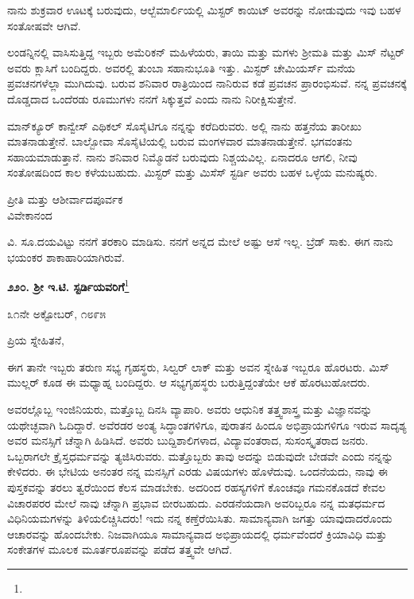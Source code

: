 ನಾನು ಶುಕ್ರವಾರ ಊಟಕ್ಕೆ ಬರುವುದು, ಆಲ್ಬೆಮಾರ್ಲಿಯಲ್ಲಿ ಮಿಸ್ಟರ್ ಕಾಯಿಟ್ ಅವರನ್ನು ನೋಡುವುದು ಇವು ಬಹಳ ಸಂತೋಷವೇ ಆಗಿವೆ.

\vspace{0.1cm}

ಲಂಡನ್ನಿನಲ್ಲಿ ವಾಸಿಸುತ್ತಿದ್ದ ಇಬ್ಬರು ಅಮೆರಿಕನ್‌ ಮಹಿಳೆಯರು, ತಾಯಿ ಮತ್ತು ಮಗಳು ಶ‍್ರೀಮತಿ ಮತ್ತು ಮಿಸ್‌ ನೆಟ್ಟರ್ ಅವರು ಕ್ಲಾಸಿಗೆ ಬಂದಿದ್ದರು. ಅವರಲ್ಲಿ ತುಂಬಾ ಸಹಾನುಭೂತಿ ಇತ್ತು. ಮಿಸ್ಟರ್ ಚೇಮಿಯರ್ಸ್ ಮನೆಯ ಪ್ರವಚನಗಳೆಲ್ಲಾ ಮುಗಿದುವು. ಬರುವ ಶನಿವಾರ ರಾತ್ರಿಯಿಂದ ನಾನಿರುವ ಕಡೆ ಪ್ರವಚನ ಪ್ರಾರಂಭಿಸುವೆ. ನನ್ನ ಪ್ರವಚನಕ್ಕೆ ದೊಡ್ಡದಾದ ಒಂದೆರಡು ರೂಮುಗಳು ನನಗೆ ಸಿಕ್ಕುತ್ತವೆ ಎಂದು ನಾನು ನಿರೀಕ್ಷಿಸುತ್ತೇನೆ.

\vspace{0.1cm}

ಮಾನ್‌ಕ್ಯೂರ್ ಕಾನ್ವೇಸ್ ಎಥಿಕಲ್ ಸೊಸೈಟಿಗೂ ನನ್ನನ್ನು ಕರೆದಿರುವರು. ಅಲ್ಲಿ ನಾನು ಹತ್ತನೆಯ ತಾರೀಖು ಮಾತನಾಡುತ್ತೇನೆ. ಬಾಲ್ಬೋವಾ ಸೊಸೈಟಿಯಲ್ಲಿ ಬರುವ ಮಂಗಳವಾರ ಮಾತನಾಡುತ್ತೇನೆ. ಭಗವಂತನು ಸಹಾಯಮಾಡುತ್ತಾನೆ. ನಾನು ಶನಿವಾರ ನಿಮ್ಮೊಡನೆ ಬರುವುದು ನಿಶ್ಚಯವಿಲ್ಲ. ಏನಾದರೂ ಆಗಲಿ, ನೀವು ಸಂತೋಷದಿಂದ ಕಾಲ ಕಳೆಯಬಹುದು. ಮಿಸ್ಟರ್‌ ಮತ್ತು ಮಿಸೆಸ್ ಸ್ಟರ್ಡಿ ಅವರು ಬಹಳ ಒಳ್ಳೆಯ ಮನುಷ್ಯರು.

\begin{flushright}
ಪ್ರೀತಿ ಮತ್ತು ಆಶೀರ್ವಾದಪೂರ್ವಕ\\ವಿವೇಕಾನಂದ
\end{flushright}

ವಿ. ಸೂ.\enginline{-}ದಯವಿಟ್ಟು ನನಗೆ ತರಕಾರಿ ಮಾಡಿಸು. ನನಗೆ ಅನ್ನದ ಮೇಲೆ ಅಷ್ಟು ಆಸೆ ಇಲ್ಲ. ಬ್ರೆಡ್ ಸಾಕು. ಈಗ ನಾನು ಭಯಂಕರ ಶಾಕಾಹಾರಿಯಾಗಿರುವೆ.

\begin{center}
\textbf{೨೨೦. ಶ‍್ರೀ ಇ.ಟಿ. ಸ್ಟರ್ಡಿಯವರಿಗೆ}\footnote{}
\end{center}

\begin{flushright}
೩೧ನೇ ಅಕ್ಟೋಬರ್, ೧೮೯೫
\end{flushright}

\noindent
ಪ್ರಿಯ ಸ್ನೇಹಿತನೆ,

\vspace{0.1cm}

ಈಗ ತಾನೇ ಇಬ್ಬರು ತರುಣ ಸಭ್ಯ ಗೃಹಸ್ಥರು, ಸಿಲ್ವರ್ ಲಾಕ್ ಮತ್ತು ಅವನ ಸ್ನೇಹಿತ ಇಬ್ಬರೂ ಹೊರಟರು. ಮಿಸ್ ಮುಲ್ಲರ್ ಕೂಡ ಈ ಮಧ್ಯಾಹ್ನ ಬಂದಿದ್ದರು. ಆ ಸಭ್ಯಗೃಹಸ್ಥರು ಬರುತ್ತಿದ್ದಂತೆಯೇ ಆಕೆ ಹೊರಟುಹೋದರು.

\vspace{0.1cm}

ಅವರಲ್ಲೊಬ್ಬ ಇಂಜಿನಿಯರು, ಮತ್ತೊಬ್ಬ ದಿನಸಿ ವ್ಯಾಪಾರಿ. ಅವರು ಆಧುನಿಕ ತತ್ತ್ವಶಾಸ್ತ್ರ ಮತ್ತು ವಿಜ್ಞಾನವನ್ನು ಯಥೇಚ್ಛವಾಗಿ ಓದಿದ್ದಾರೆ. ಅವೆರಡರ ಅಂತ್ಯ ಸಿದ್ಧಾಂತಗಳಿಗೂ, ಪುರಾತನ ಹಿಂದೂ ಅಭಿಪ್ರಾಯಗಳಿಗೂ ಇರುವ ಸಾದೃಶ್ಯ ಅವರ ಮನಸ್ಸಿಗೆ ಚೆನ್ನಾಗಿ ಹಿಡಿಸಿದೆ. ಅವರು ಬುದ್ದಿಶಾಲಿಗಳಾದ, ವಿದ್ಯಾವಂತರಾದ, ಸುಸಂಸ್ಕೃತರಾದ ಜನರು. ಒಬ್ಬರಾಗಲೇ ಕ್ರೈಸ್ತಧರ್ಮವನ್ನು ತ್ಯಜಿಸಿರುವರು. ಮತ್ತೊಬ್ಬರು ತಾವು ಅದನ್ನು ಬಿಡುವುದೇ ಬೇಡವೇ ಎಂದು ನನ್ನನ್ನು ಕೇಳಿದರು. ಈ ಭೇಟಿಯ ಅನಂತರ ನನ್ನ ಮನಸ್ಸಿಗೆ ಎರಡು ವಿಷಯಗಳು ಹೊಳೆದುವು. ಒಂದನೆಯದು, ನಾವು ಈ ಪುಸ್ತಕವನ್ನು ತರಲು ತ್ವರೆಯಿಂದ ಕೆಲಸ ಮಾಡಬೇಕು. ಅದರಿಂದ ರಹಸ್ಯಗಳಿಗೆ ಕೊಂಚವೂ ಗಮನಕೊಡದೆ ಕೇವಲ ವಿಚಾರಪರರ ಮೇಲೆ ನಾವು ಚೆನ್ನಾಗಿ ಪ್ರಭಾವ ಬೀರಬಹುದು. ಎರಡನೆಯದಾಗಿ ಅವರಿಬ್ಬರೂ ನನ್ನ ಮತಧರ್ಮದ ವಿಧಿನಿಯಮಗಳನ್ನು ತಿಳಿಯಲಿಚ್ಚಿಸಿದರು! ಇದು ನನ್ನ ಕಣ್ತೆರೆಯಿಸಿತು. ಸಾಮಾನ್ಯವಾಗಿ ಜಗತ್ತು ಯಾವುದಾದರೊಂದು ಆಚಾರವನ್ನು ಹೊಂದಬೇಕು. ನಿಜವಾಗಿಯೂ ಸಾಮಾನ್ಯವಾದ ಅಭಿಪ್ರಾಯದಲ್ಲಿ ಧರ್ಮವೆಂದರೆ ಕ್ರಿಯಾವಿಧಿ ಮತ್ತು ಸಂಕೇತಗಳ ಮೂಲಕ ಮೂರ್ತರೂಪವನ್ನು ಪಡೆದ ತತ್ತ್ವವೇ ಆಗಿದೆ.

